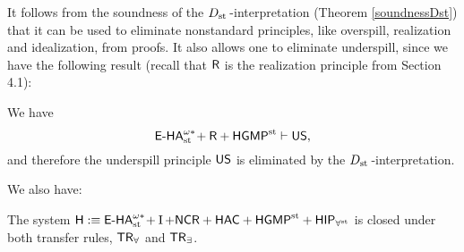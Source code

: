 It follows from the soundness of the $\D$-interpretation (Theorem \ref{soundnessDst}) that it can be used to eliminate nonstandard principles, like overspill, realization and idealization, from proofs. It also allows one to eliminate underspill, since we have the following result (recall that $\R$ is the realization principle from Section 4.1):
\begin{prop} \label{USfromRHGMP} We have
\[ \ehaststar + \R + \HGMP \vdash \US, \]
and therefore the underspill principle $\US$ is eliminated by the $\D$-interpretation.
\end{prop}

We also have:
\begin{prop}
The system $\HH :\equiv \ehaststar + \I + \NCR + \HAC + \HGMP +  \HIP_{\forallst}$ is closed under both transfer rules, $\TRA$ and $\TRE$.
\end{prop}



